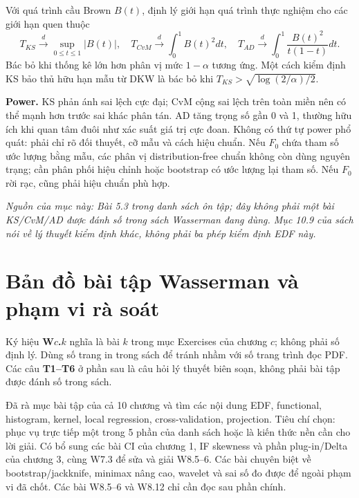 \documentclass[11pt,a4paper]{article}
\newcommand{\dto}{\xrightarrow{d}}\newcommand{\pto}{\xrightarrow{P}}
\begin{document}
Với quá trình cầu Brown $B(t)$, định lý giới hạn quá trình thực nghiệm cho các giới hạn quen thuộc
\[
T_{KS}\dto\sup_{0\le t\le1}|B(t)|,\quad
T_{CvM}\dto\int_0^1B(t)^2dt,\quad
T_{AD}\dto\int_0^1\frac{B(t)^2}{t(1-t)}dt.
\]
Bác bỏ khi thống kê lớn hơn phân vị mức $1-\alpha$ tương ứng. Một cách kiểm định KS bảo thủ hữu hạn mẫu từ DKW là bác bỏ khi
$T_{KS}>\sqrt{\log(2/\alpha)/2}$.

\textbf{Power.} KS phản ánh sai lệch cực đại; CvM cộng sai lệch trên toàn miền nên có thể mạnh hơn trước sai khác phân tán. AD tăng trọng số gần 0 và 1, thường hữu ích khi quan tâm đuôi như xác suất giá trị cực đoan. Không có thứ tự power phổ quát: phải chỉ rõ đối thuyết, cỡ mẫu và cách hiệu chuẩn. Nếu $F_0$ chứa tham số ước lượng bằng mẫu, các phân vị distribution-free chuẩn không còn dùng nguyên trạng; cần phân phối hiệu chỉnh hoặc bootstrap có ước lượng lại tham số. Nếu $F_0$ rời rạc, cũng phải hiệu chuẩn phù hợp.

\textit{Nguồn của mục này: Bài 5.3 trong danh sách ôn tập; đây không phải một bài KS/CvM/AD được đánh số trong sách Wasserman đang dùng. Mục 10.9 của sách nói về lý thuyết kiểm định khác, không phải ba phép kiểm định EDF này.}

\clearpage
\section{Bản đồ bài tập Wasserman và phạm vi rà soát}
\label{sec:map}
Ký hiệu \textbf{W$c$.$k$} nghĩa là bài $k$ trong mục Exercises của chương $c$; không phải số định lý. Dùng số trang in trong sách để tránh nhầm với số trang trình đọc PDF. Các câu \textbf{T1--T6} ở phần sau là câu hỏi lý thuyết biên soạn, không phải bài tập được đánh số trong sách.

Đã rà mục bài tập của cả 10 chương và tìm các nội dung EDF, functional, histogram, kernel, local regression, cross-validation, projection. Tiêu chí chọn: phục vụ trực tiếp một trong 5 phần của danh sách hoặc là kiến thức nền cần cho lời giải. Có bổ sung các bài CI của chương 1, IF skewness và phần plug-in/Delta của chương 3, cùng W7.3 để sửa và giải W8.5--6. Các bài chuyên biệt về bootstrap/jackknife, minimax nâng cao, wavelet và sai số đo được để ngoài phạm vi đã chốt. Các bài W8.5--6 và W8.12 chỉ cần đọc sau phần chính.
\end{document}
